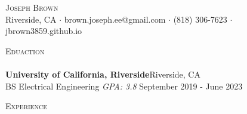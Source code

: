 \documentclass[a4paper]{article}
\newcommand{\lineunder} {
    \vspace*{-8pt} \\
    \hspace*{-18pt} \hrulefill \\
}
\newcommand{\header} [1] {
    {\hspace*{-18pt}\vspace*{6pt} \textsc{#1}}
    \vspace*{-6pt} \lineunder
}
\begin{document}
\vspace*{-40pt}



\vspace*{-10pt}
\begin{center}
	{\Huge \scshape {Joseph Brown}}\\
	Riverside, CA $\cdot$ brown.joseph.ee@gmail.com $\cdot$ (818) 306-7623 $\cdot$ jbrown3859.github.io\\
\end{center}

\header{Eduaction}
\textbf{University of California, Riverside}\hfill Riverside, CA\\
BS Electrical Engineering \textit{GPA: 3.8} \hfill September 2019 - June 2023\\
\vspace{2mm}

\header{Experience}
\vspace{1mm}
\end{document}
